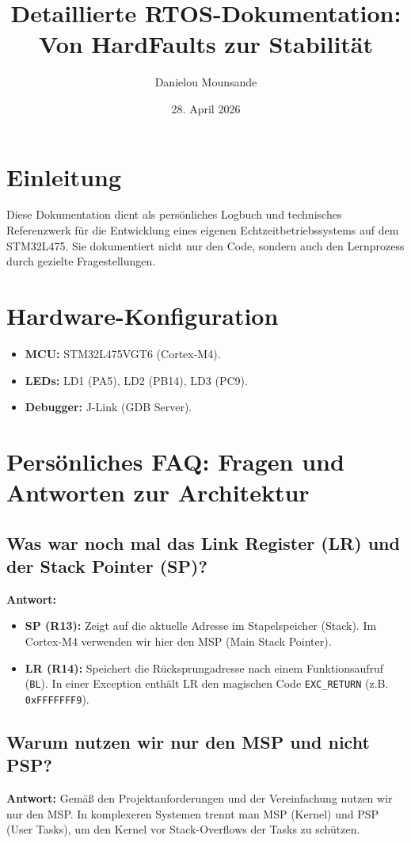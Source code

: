 \documentclass[11pt,a4paper]{article}
\title{Detaillierte RTOS-Dokumentation: Von HardFaults zur Stabilität}
\author{Danielou Mounsande}
\date{28. April 2026}
\begin{document}
\maketitle
\tableofcontents
\newpage

\section{Einleitung}
Diese Dokumentation dient als persönliches Logbuch und technisches Referenzwerk für die Entwicklung eines eigenen Echtzeitbetriebssystems auf dem STM32L475. Sie dokumentiert nicht nur den Code, sondern auch den Lernprozess durch gezielte Fragestellungen.

\section{Hardware-Konfiguration}
\begin{itemize}
    \item \textbf{MCU:} STM32L475VGT6 (Cortex-M4).
    \item \textbf{LEDs:} LD1 (PA5), LD2 (PB14), LD3 (PC9).
    \item \textbf{Debugger:} J-Link (GDB Server).
\end{itemize}

\section{Persönliches FAQ: Fragen und Antworten zur Architektur}

\subsection{Was war noch mal das Link Register (LR) und der Stack Pointer (SP)?}
\textbf{Antwort:} 
\begin{itemize}
    \item \textbf{SP (R13):} Zeigt auf die aktuelle Adresse im Stapelspeicher (Stack). Im Cortex-M4 verwenden wir hier den MSP (Main Stack Pointer).
    \item \textbf{LR (R14):} Speichert die Rücksprungadresse nach einem Funktionsaufruf (\texttt{BL}). In einer Exception enthält LR den magischen Code \texttt{EXC_RETURN} (z.B. \texttt{0xFFFFFFF9}).
\end{itemize}

\subsection{Warum nutzen wir nur den MSP und nicht PSP?}
\textbf{Antwort:} Gemäß den Projektanforderungen und der Vereinfachung nutzen wir nur den MSP. In komplexeren Systemen trennt man MSP (Kernel) und PSP (User Tasks), um den Kernel vor Stack-Overflows der Tasks zu schützen.
\end{document}
